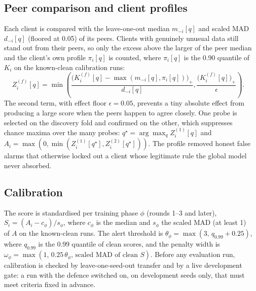 \documentclass[conference]{IEEEtran}
\begin{document}
\subsection{Peer comparison and client profiles}
Each client is compared with the leave-one-out median $m_{-i}[q]$ and scaled MAD $d_{-i}[q]$ (floored at 0.05) of its peers. Clients with genuinely unusual data still stand out from their peers, so only the excess above the larger of the peer median and the client's own profile $\pi_i[q]$ is counted, where $\pi_i[q]$ is the 0.90 quantile of $K_i$ on the known-clean calibration runs:
\begin{equation}
Z_i^{(f)}[q] = \min\!\left(\frac{\big(K_i^{(f)}[q] - \max(m_{-i}[q], \pi_i[q])\big)_+}{d_{-i}[q]}, \frac{\big(K_i^{(f)}[q]\big)_+}{\epsilon}\right).
\end{equation}
The second term, with effect floor $\epsilon = 0.05$, prevents a tiny absolute effect from producing a large score when the peers happen to agree closely. One probe is selected on the discovery fold and confirmed on the other, which suppresses chance maxima over the many probes: $q^\star = \arg\max_q Z_i^{(1)}[q]$ and $A_i = \max(0, \min(Z_i^{(1)}[q^\star], Z_i^{(2)}[q^\star]))$. The profile removed honest false alarms that otherwise locked out a client whose legitimate rule the global model never absorbed.

\subsection{Calibration}
The score is standardised per training phase $\phi$ (rounds 1--3 and later), $S_i = (A_i - c_{\phi})/s_{\phi}$, where $c_\phi$ is the median and $s_\phi$ the scaled MAD (at least 1) of $A$ on the known-clean runs. The alert threshold is $\theta_\phi = \max(3,\, q_{0.99} + 0.25)$, where $q_{0.99}$ is the 0.99 quantile of clean scores, and the penalty width is $\omega_\phi = \max(1,\, 0.25\,\theta_\phi,\, \text{scaled MAD of clean } S)$. Before any evaluation run, calibration is checked by leave-one-seed-out transfer and by a live development gate: a run with the defence switched on, on development seeds only, that must meet criteria fixed in advance.
\end{document}
